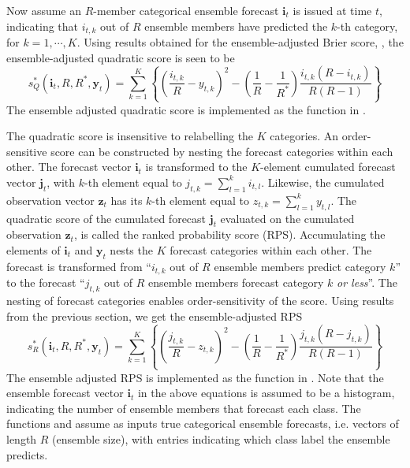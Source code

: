 \documentclass[article]{jss}\usepackage{graphicx, color}
\begin{document}
Now assume an $R$-member categorical ensemble forecast $\mathbf{i}_t$ is issued at time $t$, indicating that $i_{t,k}$ out of $R$ ensemble members have predicted the $k$-th category, for $k=1,\cdots,K$.
Using results obtained for the ensemble-adjusted Brier score, \citep[see also][]{ferro2008effect}, the ensemble-adjusted quadratic score is seen to be
%
\begin{equation}
s_{Q}^*(\mathbf{i}_t, R, R^*, \mathbf{y}_t) = \sum_{k=1}^K \left\{ \left(\frac{i_{t,k}}{R} - y_{t,k}\right)^2 - \left(\frac{1}{R} - \frac{1}{R^*}\right) \frac{i_{t,k}(R-i_{t,k})}{R(R-1)}\right\}
\end{equation}
%
The ensemble adjusted quadratic score is implemented as the function  in .


The quadratic score is insensitive to relabelling the $K$ categories.
An order-sensitive score can be constructed by nesting the forecast categories within each other.
The forecast vector $\mathbf{i}_t$ is transformed to the $K$-element cumulated forecast vector $\mathbf{j}_t$, with $k$-th element equal to $j_{t,k} = \sum_{l=1}^k i_{t,l}$.
Likewise, the cumulated observation vector $\mathbf{z}_t$ has its $k$-th element equal to $z_{t,k} = \sum_{l=1}^k y_{t,l}$.
The quadratic score of the cumulated forecast $\mathbf{j}_t$ evaluated on the cumulated observation $\mathbf{z}_t$, is called the ranked probability score (RPS).
Accumulating the elements of $\mathbf{i}_t$ and $\mathbf{y}_t$ nests the $K$ forecast categories within each other. 
The forecast is transformed from ``$i_{t,k}$ out of $R$ ensemble members predict category $k$'' to the forecast ``$j_{t,k}$ out of $R$ ensemble members forecast category $k$ \emph{or less}''.
The nesting of forecast categories enables order-sensitivity of the score.
Using results from the previous section, we get the ensemble-adjusted RPS
%
\begin{equation}
s_{R}^*(\mathbf{i}_t, R, R^*, \mathbf{y}_t) = \sum_{k=1}^K \left\{ \left(\frac{j_{t,k}}{R} - z_{t,k}\right)^2 - \left(\frac{1}{R} - \frac{1}{R^*}\right) \frac{j_{t,k}(R-j_{t,k})}{R(R-1)}\right\}
\end{equation}
%
The ensemble adjusted RPS is implemented as the function  in .
Note that the ensemble forecast vector $\mathbf{i}_t$ in the above equations is assumed to be a histogram, indicating the number of ensemble members that forecast each class. 
The functions  and  assume as inputs true categorical ensemble forecasts, i.e. vectors of length $R$ (ensemble size), with entries indicating which class label the ensemble predicts.
\end{document}
